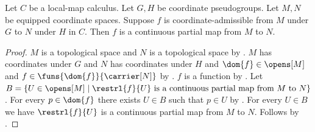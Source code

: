 \begin{theorem}\label{coordinate_admissible_is_continuous}
    Let $C$ be a local-map calculus.
    Let $G,H$ be coordinate pseudogroups.
    Let $M,N$ be equipped coordinate spaces.
    Suppose $f$ is coordinate-admissible from $M$ under $G$ to $N$ under $H$ in $C$.
    Then $f$ is a continuous partial map from $M$ to $N$.
\end{theorem}
\begin{proof}
    $M$ is a topological space and $N$ is a topological space by
        .
    $M$ has coordinates under $G$ and $N$ has coordinates under $H$ and
        $\dom{f}\in\opens[M]$ and $f\in\funs{\dom{f}}{\carrier[N]}$ by
        .
    $f$ is a function by .
    Let $B=\{U\in\opens[M]\mid
        \text{$\restrl{f}{U}$ is a continuous partial map from $M$ to $N$}\}$.
    For every $p\in\dom{f}$ there exists $U\in B$ such that $p\in U$ by
        .
    For every $U\in B$ we have $\restrl{f}{U}$ is a continuous partial map from $M$ to $N$.
    Follows by .
\end{proof}

